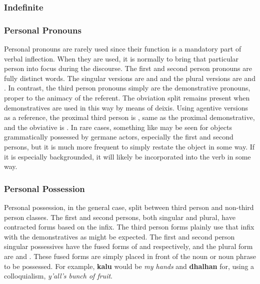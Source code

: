     \subsubsection{Indefinite}
    \subsubsection{Personal Pronouns}
    Personal pronouns are rarely used since their function is a mandatory part of verbal inflection. When they are used, it is normally to bring that particular person into focus during the discourse. The first and second person pronouns are fully distinct words. The singular versions are \textbf{\firstpn} and \textbf{\secondpn} and the plural versions are \textbf{\firstpn\agtvowelplural} and \textbf{\secondpn\agtconsplural}. In contrast, the third person pronouns simply are the demonstrative pronouns, proper to the animacy of the referent. The obviation split remains present when demonstratives are used in this way by means of deixis. Using agentive versions as a reference, the proximal third person is \textbf{\proximal\agtsuffix}, same as the proximal demonstrative, and the obviative is \textbf{\distal\agtsuffix}. In rare cases, something like \textbf{\mediodistal\agtsuffix} may be seen for objects grammatically possessed by germane actors, especially the first and second persons, but it is much more frequent to simply restate the object in some way. If it is especially backgrounded, it will likely be incorporated into the verb in some way.
    \vertspace

    \subsubsection{Personal Possession}
    Personal possession, in the general case, split between third person and non-third person classes. The first and second persons, both singular and plural, have contracted forms based on the \infixtext{\possessive} infix. The third person forms plainly use that infix with the demonstratives as might be expected. The first and second person singular possessives have the fused forms of \textbf{\firstsgposs} and \textbf{\secondsgposs} respectively, and the plural form are \textbf{\firstplposs} and \textbf{\secondplposs}. These fused forms are simply placed in front of the noun or noun phrase to be possessed. For example, \textbf{\firstsgposs\space kalu\inanvowelplural} would be \textit{my hands} and \textbf{\secondplposs\space dhalhan} for, using a colloquialism, \textit{y'all's bunch of fruit}.
    
